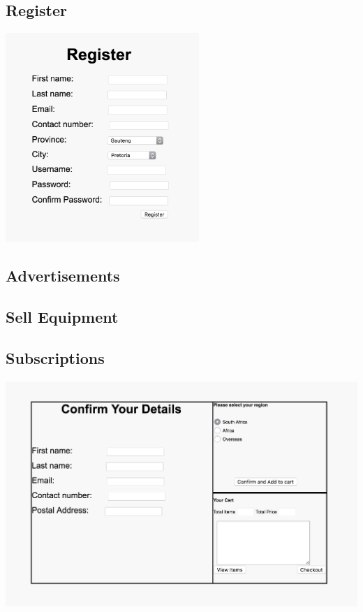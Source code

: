 \documentclass[11pt]{article}
\begin{document}
	\subsection{Register}
		\includegraphics[width=0.55\textwidth]{../Images/Pages/Register}
	\subsection{Advertisements}
	\subsection{Sell Equipment}
	\subsection{Subscriptions}
	\includegraphics[width=\textwidth]{../Images/Pages/Subscriptions}
\end{document}

